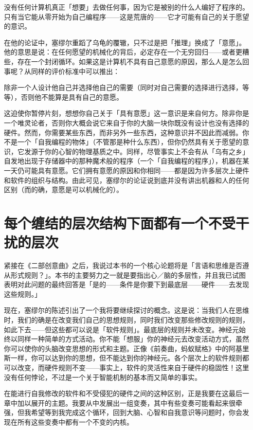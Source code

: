 \documentclass[
  12pt,
  twoside,
  openright,
  oldfontcommands,
]{memoir}
\newenvironment{fsquote}{%
  \begin{mdframed}[style=gebquote]\kaitifamily\small%
}{%
  \end{mdframed}%
}
\begin{document}
没有任何计算机真正「想要」去做任何事，因为它是被别的什么人编好了程序的。只有当它能从零开始为自己编程序------这是荒唐的------它才可能有自己的关于愿望的意识。

在他的论证中，塞缪尔重蹈了乌龟的覆辙，只不过是把「推理」换成了「意愿」。他的意思是说：在任何愿望的机械化的背后，必定存在一个无穷回归------或者更糟些，存在一个封闭循环。如果这是计算机不具有自己意愿的原因，那么人是怎么回事呢？从同样的评价标准中可以推出：

\begin{fsquote}
除非一个人设计他自己并选择他自己的需要（同时对自己需要的选择进行选择，等等），否则他不能算是具有自己的意愿。
\end{fsquote}

这迫使你暂停片刻，想想你自己关于「具有意愿」这一意识是来自何方。除非你是一个唯灵论者，否则你大概会说它来自于你的大脑一块你既没有设计也没有选择的硬件。然而，你需要某些东西，而非另外一些东西，这种意识并不因此而减弱。你不是一个「自我编程的物体」（不管那是种什么东西），但你仍然具有关于愿望的意识，它发源于你的心智的物理基质之中。同样，尽管事实上不会有从「乌有之乡」自发地出现于存储器中的那种魔术般的程序（一个「自我编程的程序」），机器在某一天仍可能具有意愿。它们拥有意愿的原因和你相同------都是因为许多层次上硬件和软件的组织与结构。由此可见，塞缪尔的论证说到底并没有讲出机器和人的任何区别（而的确，意愿是可以机械化的）。

\section{每个缠结的层次结构下面都有一个不受干扰的层次}

紧接在《二部创意曲》之后，我说过本书的一个核心论题将是「言语和思维是否遵从形式规则？」。本书的主要努力之一就是要指出心／脑的多层性，并且我已试图表明对此问题的最终回答是「是的------条件是你要下到最底层------硬件------去发现这些规则。」

现在，塞缪尔的陈述引出了一个我将要继续探讨的概念。这是说：当我们人在思维时，我们的确是在改变我们自己的思想规则，同时我们改变那些修改规则的规则，如此下去------但这些都可以说是「软件规则」。最底层的规则并未改变。神经元始终以同样一种简单的方式活动。你不能「想服」你的神经元去改变活动方式，虽然你可以使你的头脑改变思想的形式和主题。正像《前奏曲，蚂蚁赋格》中的阿基里斯一样，你可以达到你的思想，但不能达到你的神经元。各个层次上的软件规则都可以改变，而硬件规则不变------事实上，软件的灵活性来自于硬件的稳固性！这里没有任何悖论，不过是一个关于智能机制的基本而又简单的事实。

在能进行自我修改的软件和不受侵犯的硬件之间的这种区别，正是我要在这最后一章中加以展开的主题。我要从中发展出一组变奏，其中有些变奏可能看起来很牵强，但我希望等到我完成这个循环，回到大脑、心智和自我意识等问题时，你会发现在所有这些变奏中都有一个不变的内核。
\end{document}
